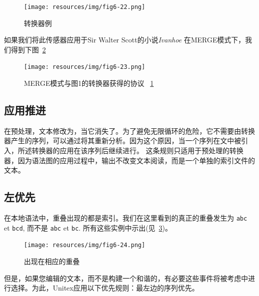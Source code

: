\begin{figure}[!h]
\begin{center}
\texttt{[image: resources/img/fig6-22.png]}
\caption{转换器例\label{fig-transducer-example}}
\end{center}
\end{figure}

\bigskip
\noindent 
\noindent 如果我们将此传感器应用于Sir Walter Scott的小说\textit{Ivanhoe} 
在MERGE模式下，我们得到下图~\ref{fig-transducer-example-concordance} 


\begin{figure}[!h]
\begin{center}
\texttt{[image: resources/img/fig6-23.png]}
\caption{MERGE模式与图1的转换器获得的协议
~\ref{fig-transducer-example}\label{fig-transducer-example-concordance}}
\end{center}
\end{figure}

\subsection{应用推进}
在预处理，文本修改为，当它消失了。为了避免无限循环的危险，它不需要由转换器产生的序列，可以通过将其重新分析。因为这个原因，当一个序列在文中被引入，所述转换器的应用在该序列后继续进行。
这条规则只适用于预处理的转换器，因为语法图的应用过程中，输出不改变文本阅读，而是一个单独的索引文件的文本。


\subsection{左优先}
\label{section-priorite-gauche}
 
在本地语法中，重叠出现的都是索引。我们在这里看到的真正的重叠发生为 \verb+abc+ et \verb+bcd+, 而不是 \verb+abc+ et \verb+bc+.
所有这些实例中示出(见~\ref{fig-overlappping-occurrences})。

\begin{figure}[!h]
\begin{center}
\texttt{[image: resources/img/fig6-24.png]}
\caption{出现在相应的重叠\label{fig-overlappping-occurrences}}
\end{center}
\end{figure}

\noindent 但是，如果您编辑的文本，而不是构建一个和谐的，有必要这些事件将被考虑中进行选择。为此，Unitex应用以下优先规则：最左边的序列优先。

